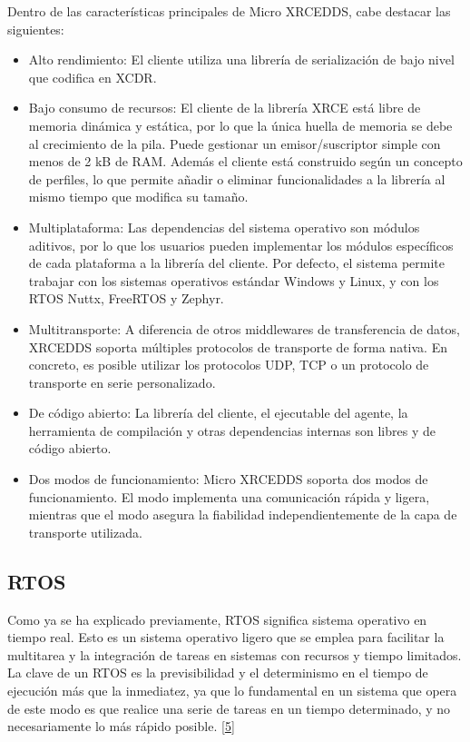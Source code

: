 \documentclass[a4paper,11pt,spanish]{sphinxmanual}
\begin{document}
\sphinxAtStartPar
Dentro de las características principales de Micro XRCE\sphinxhyphen{}DDS, cabe
destacar las siguientes:
\begin{itemize}
\item {} 
\sphinxAtStartPar
Alto rendimiento: El cliente utiliza una librería de serialización
de bajo nivel que codifica en XCDR.

\item {} 
\sphinxAtStartPar
Bajo consumo de recursos: El cliente de la librería XRCE está libre de memoria
dinámica y estática, por lo que la única huella de memoria se
debe al crecimiento de la pila. Puede gestionar un emisor/suscriptor simple
con menos de 2 kB de RAM. Además el cliente está construido según un
concepto de perfiles, lo que permite añadir o eliminar funcionalidades a la
librería al mismo tiempo que modifica su tamaño.

\item {} 
\sphinxAtStartPar
Multiplataforma: Las dependencias del sistema operativo son módulos aditivos,
por lo que los usuarios pueden implementar los módulos específicos de cada
plataforma a la librería del cliente. Por defecto, el sistema permite
trabajar con los sistemas operativos estándar Windows y Linux, y con los
RTOS Nuttx, FreeRTOS y Zephyr.

\item {} 
\sphinxAtStartPar
Multitransporte: A diferencia de otros middlewares de transferencia de datos,
XRCE\sphinxhyphen{}DDS soporta múltiples protocolos de transporte de forma nativa. En
concreto, es posible utilizar los protocolos UDP, TCP o un protocolo de
transporte en serie personalizado.

\item {} 
\sphinxAtStartPar
De código abierto: La librería del cliente, el ejecutable del agente,
la herramienta de compilación y otras dependencias internas son libres y de
código abierto.

\item {} 
\sphinxAtStartPar
Dos modos de funcionamiento: Micro XRCE\sphinxhyphen{}DDS soporta dos modos de
funcionamiento. El modo  implementa una comunicación
rápida y ligera, mientras que el modo  asegura la fiabilidad
independientemente de la capa de transporte utilizada.

\end{itemize}


\subsection{RTOS}
\label{\detokenize{software:rtos}}
\sphinxAtStartPar
Como ya se ha explicado previamente, RTOS significa sistema operativo en
tiempo real. Esto es un sistema operativo ligero que se emplea para facilitar
la multitarea y la integración de tareas en sistemas con recursos y tiempo
limitados. La clave de un RTOS es la previsibilidad y el determinismo en el
tiempo de ejecución más que la inmediatez, ya que lo fundamental en un
sistema que opera de este modo es que realice una serie de tareas en un tiempo
determinado, y no necesariamente lo más rápido posible. {[}\hyperlink{cite.marco_teorico_y_estado_del_arte:id25}{5}{]}
\end{document}
